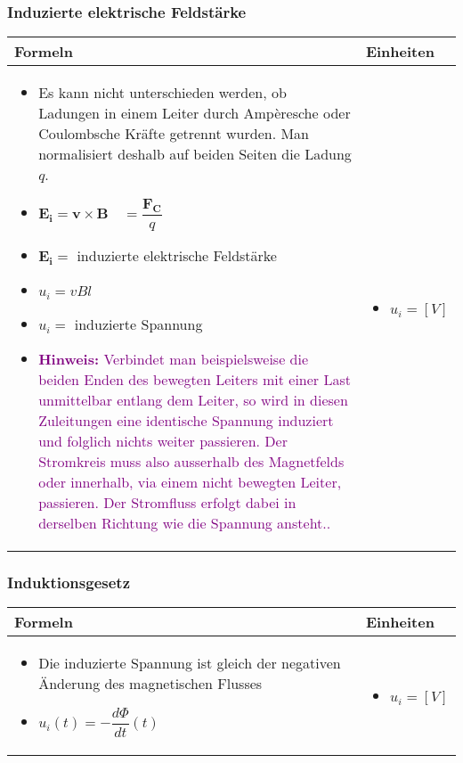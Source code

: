 \subsubsection{Induzierte elektrische Feldstärke}   
\begin{tabular}{ | m{15cm} | m{3cm}  | }
	\hline
	Formeln & Einheiten \\ \hline
	\hline
	\begin{itemize}
		\item[] Es kann nicht unterschieden werden, ob Ladungen in einem Leiter durch Ampèresche oder Coulombsche Kräfte getrennt wurden. Man normalisiert deshalb auf beiden Seiten die Ladung $q$.
		\item $\mathbf{E_i=v\times B\quad}{=\dfrac{\mathbf{F_C}}{q}}$
		\item[] $\mathbf{E_i}=$ induzierte elektrische Feldstärke
		\item $u_i=vBl$
		\item[] $u_i=$ induzierte Spannung
		\item[] \textcolor{purple}{\textbf{Hinweis:} Verbindet man beispielsweise die beiden Enden des bewegten Leiters mit einer Last unmittelbar entlang dem Leiter, so wird in diesen Zuleitungen eine identische Spannung induziert und folglich nichts weiter passieren. Der Stromkreis muss also ausserhalb des Magnetfelds oder innerhalb, via einem nicht bewegten Leiter, passieren. Der Stromfluss erfolgt dabei in derselben Richtung wie die Spannung ansteht..}
		
	\end{itemize} 
	&   	
	\begin{itemize}
		\item[] $u_i=[V]$
	\end{itemize} 
	\\ \hline
\end{tabular}

\subsubsection{Induktionsgesetz}
   \begin{tabular}{ | m{15cm} | m{3cm}  | }
   	\hline
   	Formeln & Einheiten \\ \hline
   	\hline
   	\begin{itemize}
   		\item[] Die induzierte Spannung ist gleich der negativen Änderung des magnetischen Flusses
   		\item $u_i(t)=-\dfrac{d\Phi}{dt}(t)$
   	\end{itemize} 
   	&   	
   	\begin{itemize}

   		\item[] $u_i=[V]$
   	\end{itemize} 
   	\\ \hline
   \end{tabular}

